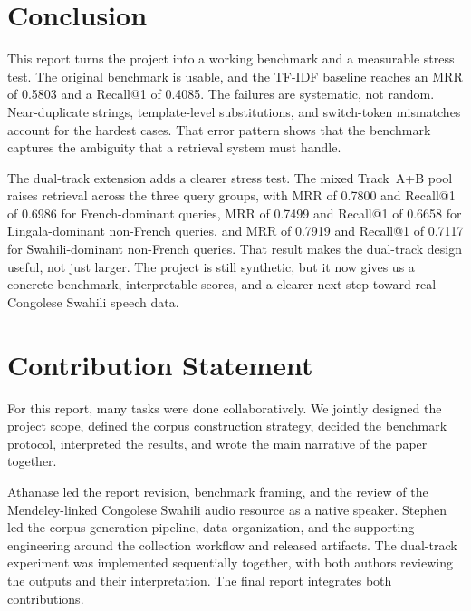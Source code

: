 \documentclass[11pt,twocolumn]{article}
\begin{document}
\section{Conclusion}
This report turns the project into a working benchmark and a measurable stress test. The original benchmark is usable, and the TF-IDF baseline reaches an MRR of 0.5803 and a Recall@1 of 0.4085. The failures are systematic, not random. Near-duplicate strings, template-level substitutions, and switch-token mismatches account for the hardest cases. That error pattern shows that the benchmark captures the ambiguity that a retrieval system must handle.

The dual-track extension adds a clearer stress test. The mixed Track~A+B pool raises retrieval across the three query groups, with MRR of 0.7800 and Recall@1 of 0.6986 for French-dominant queries, MRR of 0.7499 and Recall@1 of 0.6658 for Lingala-dominant non-French queries, and MRR of 0.7919 and Recall@1 of 0.7117 for Swahili-dominant non-French queries. That result makes the dual-track design useful, not just larger. The project is still synthetic, but it now gives us a concrete benchmark, interpretable scores, and a clearer next step toward real Congolese Swahili speech data.




\appendix
\section{Contribution Statement}
For this report, many tasks were done collaboratively. We jointly designed the project scope, defined the corpus construction strategy, decided the benchmark protocol, interpreted the results, and wrote the main narrative of the paper together.

Athanase led the report revision, benchmark framing, and the review of the Mendeley-linked Congolese Swahili audio resource as a native speaker. Stephen led the corpus generation pipeline, data organization, and the supporting engineering around the collection workflow and released artifacts. The dual-track experiment was implemented sequentially together, with both authors reviewing the outputs and their interpretation. The final report integrates both contributions.
\end{document}
